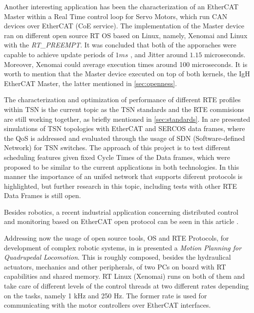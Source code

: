 Another interesting application has been the characterization of an EtherCAT Master within a Real Time control 
loop for Servo Motors, which run CAN devices over EtherCAT (CoE service). The implementation of the Master device ran on different open source RT OS based on Linux, 
namely, Xenomai and Linux with the \emph{RT\_PREEMPT}. It was concluded that both of the apporaches 
were capable to achieve update periods of $1 ms$ 
, and Jitter around $1.15$ 
microseconds. Moreover, Xenomai could average execution times around 100 microseconds\cite{ecat_xenomai}.%
It is worth to mention that the Master device executed on top of both kernels, the IgH EtherCAT Master, the 
latter mentioned in \ref{sec:openness}.

The characterization and optimization of performance of different RTE profiles within TSN is the current topic as the TSN standards and the RTE commisions are still working together,
as briefly mentioned in \ref{sec:standards}. In \cite{tsn_and_sdn} %
are presented simulations of TSN topologies with EtherCAT and SERCOS data frames, where the QoS is addressed and evaluated through the usage of SDN (Software-defined Network) for
TSN switches. The approach of this project is to test different scheduling features given fixed Cycle Times of the Data frames, which were proposed to be similar to the current applications
in both technologies. In this manner the importance of an unifed network that supports diferent protocols is highlighted, but further research in this topic, including tests with
other RTE Data Frames is still open.

Besides robotics, a recent industrial application concerning distributed control and monitoring based
on EtherCAT open protocol can be seen in this article \cite{ecat_industrial}.

Addressing now the usage of open source tools, OS and RTE Protocols, for development of complex robotic systems, in \cite{ecat_motionplanning} %
is presented a \emph{Motion Planning for Quadrupedal Locomotion}. This is roughly composed, besides the hydraulical actuators, mechanics and other peripherals, of two PCs on board with RT capabilities and shared memory. 
RT Linux (Xenomai) runs on both of them and take care of different levels of the control threads at two different rates depending on the tasks, namely 1 kHz and 250 Hz. The former rate is used
for communicating with the motor controllers over EtherCAT interfaces.

